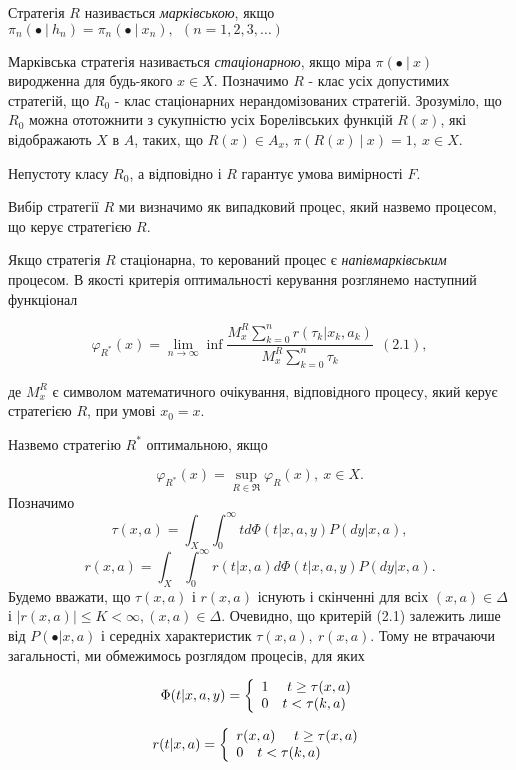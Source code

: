 \documentclass[a4paper, 14pt]{extarticle}
\begin{document}
Стратегія $R$ називається \textit{марківською}, якщо $\pi_n(\bullet \ | \ h_n) = \pi_n(\bullet \ | \ x_n), \ \ (n = 1,2,3,\ldots)$\par 
Марківська стратегія називається \textit{стаціонарною}, якщо міра $\pi(\bullet \ | \  x)$\\ виродженна для будь-якого $x \in X$. Позначимо $R$ - клас усіх допустимих стратегій, що $R_0$ - клас стаціонарних нерандомізованих стратегій. Зрозуміло, що $R_0$ можна ототожнити з сукупністю усіх Борелівських функцій $R(x)$, які відображають $X$ в $A$, таких, що $R(x) \in A_x$, $\pi(R(x) \ | \ x) = 1, \ x \in X.$

Непустоту класу $R_0$, а відповідно і $R$ гарантує умова вимірності $F$.\par 
Вибір стратегії $R$ ми визначимо як випадковий процес, який назвемо процесом, що керує стратегією $R$.\par 
Якщо стратегія $R$ стаціонарна, то керований процес є \textit{напівмарківським} процесом. В якості критерія оптимальності керування розглянемо наступний функціонал

$$ \varphi_{R^{*}}(x) = \lim_{n \rightarrow \infty} \inf \frac{ M_x^R \sum_{k=0}^n r( \tau_k | x_k,a_k)   }{M_x^R \sum_{k = 0}^{n} \tau_k}  \ \ (2.1),$$
 
де $M_x^R$ є символом математичного очікування, відповідного процесу, який керує стратегією $R$, при умові $x_0 = x$.\newline\par 
Назвемо стратегію $R^*$ оптимальною, якщо 

$$ \varphi_{R^*}(x) = \sup_{R \in \Re} \varphi_R(x), \ x \in X. $$
Позначимо
$$ \tau(x,a) = \int_X \int_0^{\infty} t d\Phi(t|x,a,y)P(dy|x,a), $$
$$ r(x,a) = \int_X \int_0^{\infty} r(t|x,a) d\Phi(t|x,a,y)P(dy|x,a). $$
Будемо вважати, що $\tau(x,a)$ і $r(x,a)$ існують і скінченні для всіх $(x,a) \in \Delta$ і $|r(x,a)| \leq K < \infty, (x,a) \in \Delta$. Очевидно, що критерій (2.1) залежить лише від $P(\bullet|x,a)$ і середніх характеристик $\tau(x,a), \ r(x,a)$. Тому не втрачаючи загальності, ми обмежимось розглядом процесів, для яких

\[ \Phi(t|x,a,y) = \left\{ 
  \begin{array}{l l}
    1  \quad \text{ $t \geq \tau(x,a)$}\\
    0  \quad \text{$t<\tau(k,a)$}
\end{array} \right.\]

\[ r(t|x,a) = \left\{ 
  \begin{array}{l l}
    r(x,a)  \quad \text{ $t \geq \tau(x,a)$}\\
    0  \quad \text{$t<\tau(k,a)$}
  \end{array} \right.\]
  
\end{document}
